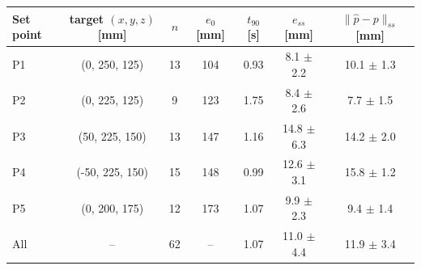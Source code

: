 \begin{tabular}{lcccccc}
\toprule
Set point & target $(x,y,z)$ [mm] & $n$ & $e_0$ [mm] & $t_{90}$ [s] & $e_{ss}$ [mm] & $\|\hat p - p\|_{ss}$ [mm] \\
\midrule
P1 & (0, 250, 125) & 13 & 104 & 0.93 & 8.1 $\pm$ 2.2 & 10.1 $\pm$ 1.3 \\
P2 & (0, 225, 125) & 9 & 123 & 1.75 & 8.4 $\pm$ 2.6 & 7.7 $\pm$ 1.5 \\
P3 & (50, 225, 150) & 13 & 147 & 1.16 & 14.8 $\pm$ 6.3 & 14.2 $\pm$ 2.0 \\
P4 & (-50, 225, 150) & 15 & 148 & 0.99 & 12.6 $\pm$ 3.1 & 15.8 $\pm$ 1.2 \\
P5 & (0, 200, 175) & 12 & 173 & 1.07 & 9.9 $\pm$ 2.3 & 9.4 $\pm$ 1.4 \\
\midrule
All & -- & 62 & -- & 1.07 & 11.0 $\pm$ 4.4 & 11.9 $\pm$ 3.4 \\
\bottomrule
\end{tabular}

